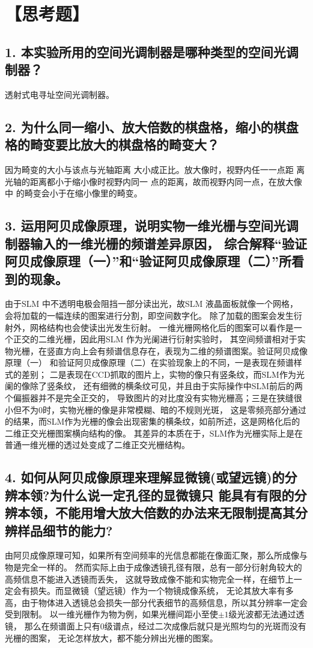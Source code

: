 \documentclass[10pt,a4paper,twoside,UTF8]{ctexart}
\begin{document}
\section*{【思考题】}
\subsection*{1. 本实验所用的空间光调制器是哪种类型的空间光调制器？}
透射式电寻址空间光调制器。
\subsection*{2. 为什么同一缩小、放大倍数的棋盘格，缩小的棋盘格的畸变要比放大的棋盘格的畸变大？}
因为畸变的大小与该点与光轴距离
大小成正比。放大像时，视野内任一一点距
离光轴的距离都小于缩小像时视野内同一
点的距离，故而视野内同一点，在放大像中
的畸变会小于在缩小像里的畸变。
\subsection*{3. 运用阿贝成像原理，说明实物一维光栅与空间光调制器输入的一维光栅的频谱差异原因，
综合解释“验证阿贝成像原理（一）”和“验证阿贝成像原理（二）”所看到的现象。}
由于SLM 中不透明电极会阻挡一部分读出光，故SLM 液晶面板就像一个网格，
会将加载的一幅连续的图案进行分割，即空间数字化。
除了加载的图案会发生衍射外，网格结构也会使读出光发生衍射。
一维光栅网格化后的图案可以看作是一个正交的二维光栅，因此用SLM 作为光阑进行衍射实验时，
其空间频谱相对于实物光栅，在竖直方向上会有频谱信息存在，表现为二维的频谱图案。验证阿贝成像原理（一）
和验证阿贝成像原理（二）在实验现象上的不同，一是表现在频谱样式的差别；
二是表现在CCD抓取的图片上，实物的像只有竖条纹，而SLM作为光阑的像除了竖条纹，
还有细微的横条纹可见，并且由于实际操作中SLM前后的两个偏振器并不是完全正交的，
导致图片的对比度没有实物光栅高；三是在狭缝很小但不为0时，实物光栅的像是非常模糊、暗的不规则光斑，
这是零频亮部分通过的结果，而SLM作为光栅的像会出现密集的横条纹，如前所述，这是网格化后的二维正交光栅图案横向结构的像。
其差异的本质在于，SLM作为光栅实际上是在普通一维光栅的透过处变成了二维正交光栅结构。
\subsection*{4. 如何从阿贝成像原理来理解显微镜(或望远镜)的分辨本领?为什么说一定孔径的显微镜只
能具有有限的分辨本领，不能用增大放大倍数的办法来无限制提高其分辨样品细节的能力?}
由阿贝成像原理可知，如果所有空间频率的光信息都能在像面汇聚，那么所成像与物是完全一样的。
然而实际上由于成像透镜孔径有限，总有一部分衍射角较大的高频信息不能进入透镜而丢失，
这就导致成像不能和实物完全一样，在细节上一定会有损失。而显微镜（望远镜）作为一个物镜成像系统，
无论其放大率有多高，由于物体进入透镜总会损失一部分代表细节的高频信息，所以其分辨率一定会受到限制。
以一维光栅作为物为例，如果光栅间距小至使$\pm 1$级光波都无法通过透镜，
那么在频谱面上只有0级谱点，经过二次成像后就只是光照均匀的光斑而没有光栅的图案，
无论怎样放大，都不能分辨出光栅的图案。
\end{document}
